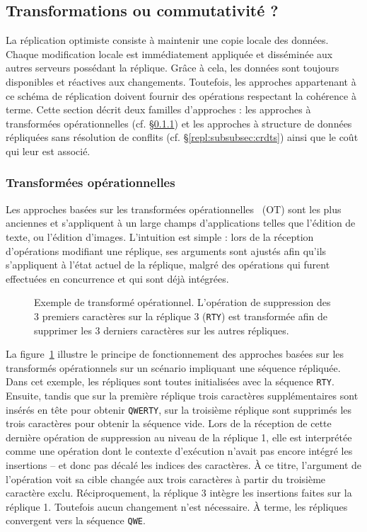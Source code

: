 \subsection{Transformations ou commutativité ?}
\label{repl:subsec:otorcrdts}

La réplication optimiste consiste à maintenir une copie locale des
données. Chaque modification locale est immédiatement appliquée et disséminée
aux autres serveurs possédant la réplique. Grâce à cela, les données sont
toujours disponibles et réactives aux changements. Toutefois, les approches
appartenant à ce schéma de réplication doivent fournir des opérations respectant
la cohérence à terme. Cette section décrit deux familles d'approches : les
approches à transformées opérationnelles (cf. §\ref{repl:subsubsec:ot}) et les
approches à structure de données répliquées sans résolution de conflits
(cf. §\ref{repl:subsubsec:crdts}) ainsi que le coût qui leur est associé.

\subsubsection{Transformées opérationnelles}
\label{repl:subsubsec:ot}

Les approches basées sur les transformées
opérationnelles~\cite{sun1998operational, sun2009contextbased} (OT) sont les
plus anciennes et s'appliquent à un large champs d'applications telles que
l'édition de texte, ou l'édition d'images. L'intuition est simple : lors de la
réception d'opérations modifiant une réplique, ses arguments sont ajustés afin
qu'ils s'appliquent à l'état actuel de la réplique, malgré des opérations qui
furent effectuées en concurrence et qui sont déjà intégrées.

\begin{figure}
  \centering
  
  \caption[Exemple de transformé opérationnel] {\label{repl:fig:otexample}
    Exemple de transformé opérationnel. L'opération de suppression des 3
    premiers caractères sur la réplique 3 (\texttt{RTY}) est transformée afin de
    supprimer les 3 derniers caractères sur les autres répliques.}
\end{figure}

La figure~\ref{repl:fig:otexample} illustre le principe de fonctionnement des
approches basées sur les transformés opérationnels sur un scénario impliquant
une séquence répliquée. Dans cet exemple, les répliques sont toutes initialisées
avec la séquence \texttt{RTY}. Ensuite, tandis que sur la première réplique
trois caractères supplémentaires sont insérés en tête pour obtenir
\texttt{QWERTY}, sur la troisième réplique sont supprimés les trois caractères
pour obtenir la séquence vide. Lors de la réception de cette dernière opération
de suppression au niveau de la réplique 1, elle est interprétée comme une
opération dont le contexte d'exécution n'avait pas encore intégré les insertions
-- et donc pas décalé les indices des caractères. À ce titre, l'argument de
l'opération voit sa cible changée aux trois caractères à partir du troisième
caractère exclu. Réciproquement, la réplique 3 intègre les insertions faites sur
la réplique 1. Toutefois aucun changement n'est nécessaire. À terme, les
répliques convergent vers la séquence \texttt{QWE}.

